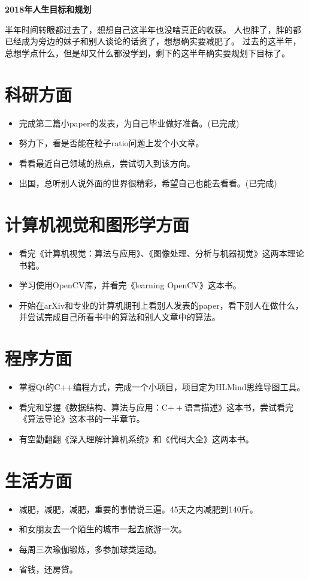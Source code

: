 \documentclass[12pt]{article}
\newcommand{\Done}{{\color{magenta}(已完成)}}
\begin{document}
\begin{center}
  {\huge{\textbf{2018年人生目标和规划}}}
\end{center}
\par
半年时间转眼都过去了，想想自己这半年也没啥真正的收获。%
人也胖了，胖的都已经成为旁边的妹子和别人谈论的话资了，想想确实要减肥了。%
过去的这半年，总想学点什么，但是却又什么都没学到，剩下的这半年确实要规划下目标了。%


\section{科研方面}
\begin{itemize}
\item{完成第二篇小paper的发表，为自己毕业做好准备。\Done}%
\item{努力下，看是否能在粒子ratio问题上发个小文章。}%
\item{看看最近自己领域的热点，尝试切入到该方向。}
\item{出国，总听别人说外面的世界很精彩，希望自己也能去看看。\Done}%
\end{itemize}

\section{计算机视觉和图形学方面}
\begin{itemize}
\item{看完《计算机视觉：算法与应用》、《图像处理、分析与机器视觉》这两本理论书籍。}
\item{学习使用OpenCV库，并看完《learning OpenCV》这本书。}
\item{开始在arXiv和专业的计算机期刊上看别人发表的paper，看下别人在做什么，%
    并尝试完成自己所看书中的算法和别人文章中的算法。}
\end{itemize}

\section{程序方面}
\begin{itemize}
\item{掌握Qt的C++编程方式，完成一个小项目，项目定为HLMind思维导图工具。}
\item{看完和掌握《数据结构、算法与应用：C$++$语言描述》这本书，尝试看完《算法导论》这本书的一半章节。}
\item{有空勤翻翻《深入理解计算机系统》和《代码大全》这两本书。}
\end{itemize}

\section{生活方面}
\begin{itemize}
\item{减肥，减肥，减肥，重要的事情说三遍。45天之内减肥到140斤。}
\item{和女朋友去一个陌生的城市一起去旅游一次。}
\item{每周三次瑜伽锻炼，多参加球类运动。}
\item{省钱，还房贷。}
\end{itemize}
\end{document}
